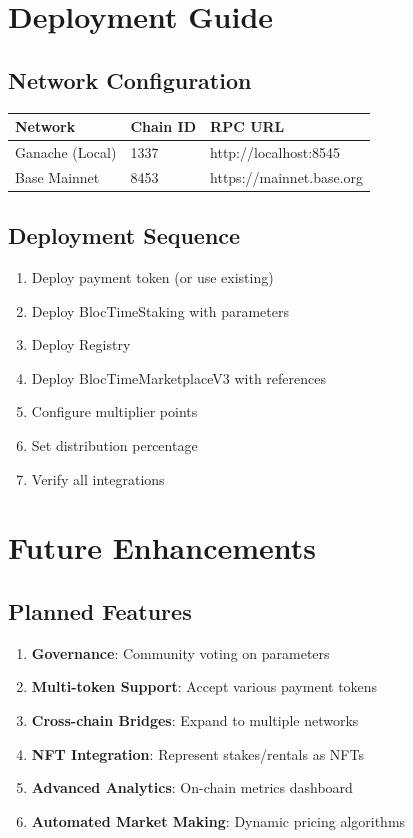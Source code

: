 \documentclass[12pt,a4paper]{article}
\begin{document}
\section{Deployment Guide}

\subsection{Network Configuration}

\begin{center}
\begin{tabular}{|l|l|l|}
\hline
\textbf{Network} & \textbf{Chain ID} & \textbf{RPC URL} \\
\hline
Ganache (Local) & 1337 & http://localhost:8545 \\
Base Mainnet & 8453 & https://mainnet.base.org \\
\hline
\end{tabular}
\end{center}

\subsection{Deployment Sequence}

\begin{enumerate}
    \item Deploy payment token (or use existing)
    \item Deploy BlocTimeStaking with parameters
    \item Deploy Registry
    \item Deploy BlocTimeMarketplaceV3 with references
    \item Configure multiplier points
    \item Set distribution percentage
    \item Verify all integrations
\end{enumerate}

\section{Future Enhancements}

\subsection{Planned Features}

\begin{enumerate}
    \item \textbf{Governance}: Community voting on parameters
    \item \textbf{Multi-token Support}: Accept various payment tokens
    \item \textbf{Cross-chain Bridges}: Expand to multiple networks
    \item \textbf{NFT Integration}: Represent stakes/rentals as NFTs
    \item \textbf{Advanced Analytics}: On-chain metrics dashboard
    \item \textbf{Automated Market Making}: Dynamic pricing algorithms
\end{enumerate}
\end{document}
